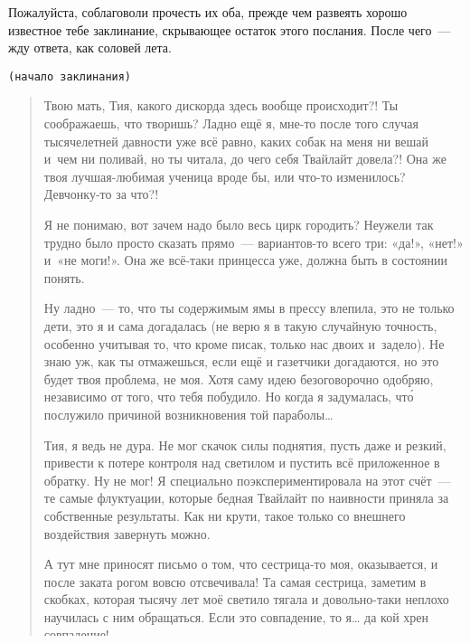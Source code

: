 \documentclass[fontsize=11pt,a5paper,titlepage=firstcover]{scrbook}
\begin{document}
Пожалуйста, соблаговоли прочесть их оба, прежде чем развеять хорошо известное тебе заклинание, скрывающее остаток этого послания. После чего~--- жду ответа, как соловей лета.

\begin{center}\texttt{(начало заклинания)}\end{center}

\begin{quotation}
Твою мать, Тия, какого дискорда здесь вообще происходит?! Ты соображаешь, что творишь? Ладно ещё я, мне-то после того случая тысячелетней давности уже всё равно, каких собак на меня ни вешай и~чем ни поливай, но ты читала, до чего себя Твайлайт довела?! Она же твоя лучшая-любимая ученица вроде бы, или что-то изменилось? Девчонку-то за что?!

Я не понимаю, вот зачем надо было весь цирк городить? Неужели так трудно было просто сказать прямо~--- вариантов-то всего три: «да!», «нет!» и~«не моги!». Она же всё-таки принцесса уже, должна быть в состоянии понять.

Ну ладно~--- то, что ты содержимым ямы в прессу влепила, это не только дети, это я и сама догадалась (не верю я в такую случайную точность, особенно учитывая то, что кроме писак, только нас двоих и~задело). Не знаю уж, как ты отмажешься, если ещё и газетчики догадаются, но это будет твоя проблема, не моя. Хотя саму идею безоговорочно одобряю, независимо от того, что тебя побудило. Но когда я задумалась, что́ послужило причиной возникновения той параболы{\ldots}

Тия, я ведь не дура. Не мог скачок силы поднятия, пусть даже и резкий, привести к потере контроля над светилом и пустить всё приложенное в обратку. Ну не мог! Я специально поэкспериментировала на этот счёт~--- те самые флуктуации, которые бедная Твайлайт по наивности приняла за собственные результаты. Как ни крути, такое только со внешнего воздействия завернуть можно.

А тут мне приносят письмо о том, что сестрица-то моя, оказывается, и после заката рогом вовсю отсвечивала! Та самая сестрица, заметим в скобках, которая тысячу лет моё светило тягала и довольно-таки неплохо научилась с ним обращаться. Если это совпадение, то я{\ldots} да кой хрен совпадение!

Короче, вот тебе моё крайнее слово --- колись! И разруливай, потому что кроме как тебе, больше некому. Ты ведь тоже не дура и должна понимать, что дальше этот фарс продолжать нельзя. Иначе, помяни моё слово, разбитыми вазами дело не ограничится.

Кстати, занявшись этими изысканиями, я тут заодно ещё кое-что посчитала. Получается, что наших с Твайлайт объединённых сил сейчас как раз хватает, чтобы забросить на лунную орбиту что угодно. Или кого угодно. Забавно, правда?
\end{quotation}
\end{document}
